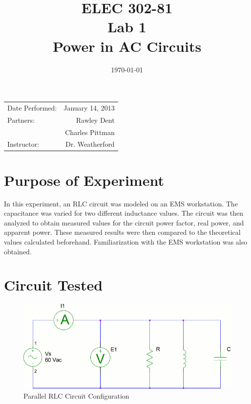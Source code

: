 \documentclass{article}
\title{ELEC 302-81\\ Lab 1\\ Power in AC Circuits} %
\date{\today} %
\begin{document}
\maketitle

\begin{center}
  \begin{tabular}{lr}
    Date Performed: & January 14, 2013 \\
    Partners: & Rawley Dent \\
              & Charles Pittman \\
    Instructor: & Dr. Weatherford
  \end{tabular}
\end{center}

\pagebreak


\section{Purpose of Experiment}
In this experiment, an RLC circuit was modeled on an EMS workstation.  The
capacitance was varied for two different inductance values. The circuit was
then analyzed to obtain measured values for the circuit power factor, real
power, and apparent power. These measured results were then compared to the
theoretical values calculated beforehand. Familiarization with the EMS
workstation was also obtained.

\section{Circuit Tested}
\begin{figure}[h]
  \begin{center}
    \includegraphics[width=.8\textwidth]{test_circuit}
    \caption{Parallel RLC Circuit Configuration}
    \label{circuit_01}
  \end{center}
\end{figure}
\end{document}
